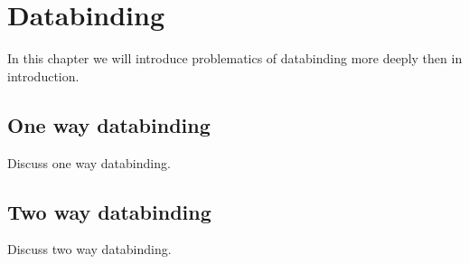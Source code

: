 \chapter{Databinding}\label{chap:databinding}
\pagestyle{headings}

In this chapter we will introduce problematics of databinding more deeply then in introduction.

\section{One way databinding}\label{sec:onewaydatabinding}

Discuss one way databinding.

\section{Two way databinding}

Discuss two way databinding.
